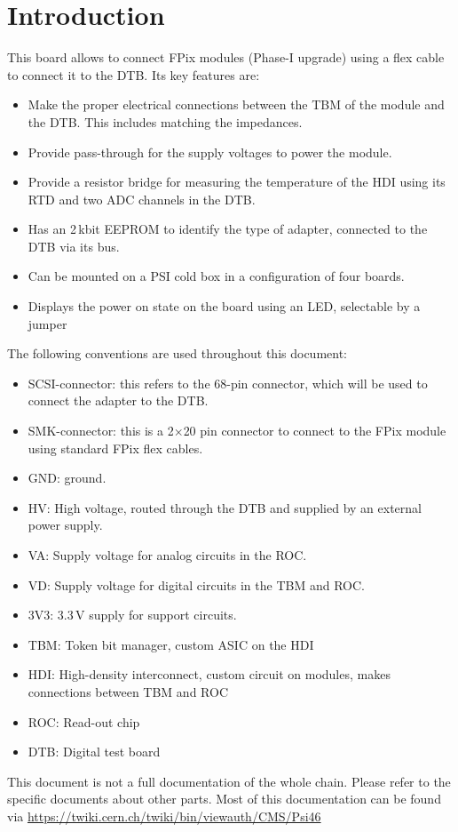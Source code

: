 \chapter{Introduction}

This board allows to connect FPix modules (Phase-I upgrade) using a flex cable to connect it to the DTB. Its key features are:
\begin{itemize}
    \item Make the proper electrical connections between the TBM of the module and the DTB. This includes matching the impedances.
    \item Provide pass-through for the supply voltages to power the module.
    \item Provide a resistor bridge for measuring the temperature of the HDI using its RTD and two ADC channels in the DTB.
    \item Has an 2\,kbit EEPROM to identify the type of adapter, connected to the DTB via its \isqc{} bus.
    \item Can be mounted on a PSI cold box in a configuration of four boards.
    \item Displays the power on state on the board using an LED, selectable by a jumper
\end{itemize}

The following conventions are used throughout this document:
\begin{itemize}
    \item SCSI-connector: this refers to the 68-pin connector, which will be used to connect the adapter to the DTB.
    \item SMK-connector: this is a 2$\times$20 pin connector to connect to the FPix module using standard FPix flex cables.
    \item GND: ground.
    \item HV: High voltage, routed through the DTB and supplied by an external power supply.
    \item VA: Supply voltage for analog circuits in the ROC.
    \item VD: Supply voltage for digital circuits in the TBM and ROC.
    \item 3V3: 3.3\,V supply for support circuits.
    \item TBM: Token bit manager, custom ASIC on the HDI
    \item HDI: High-density interconnect, custom circuit on modules, makes connections between TBM and ROC
    \item ROC: Read-out chip
    \item DTB: Digital test board
\end{itemize}
This document is not a full documentation of the whole chain. Please refer to the specific documents about other parts. Most of this documentation can be found via \url{https://twiki.cern.ch/twiki/bin/viewauth/CMS/Psi46}


